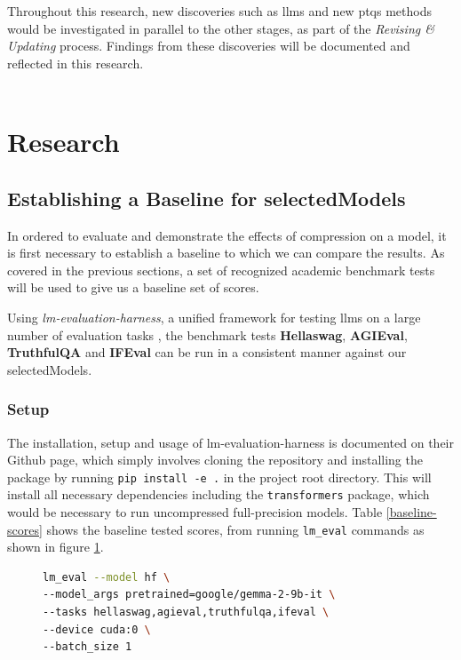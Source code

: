 \documentclass{ifacconf}
\begin{document}
	Throughout this research, new discoveries such as \glspl{llm} and new \glspl{ptq} methods would be investigated in parallel to the other stages, as part of the \textit{Revising \& Updating} process. Findings from these discoveries will be documented and reflected in this research.\\\\
	
	
	
	\section{Research}
	\subsection{Establishing a Baseline for \gls{selectedModels}}
    In ordered to evaluate and demonstrate the effects of compression on a model, it is first necessary to establish a baseline to which we can compare the results. As covered in the previous sections, a set of recognized academic benchmark tests will be used to give us a baseline set of scores.

    Using \textit{lm-evaluation-harness}, a unified framework for testing \glspl{llm} on a large number of evaluation tasks \cite{eval-harness}, the benchmark tests \textbf{Hellaswag}, \textbf{AGIEval}, \textbf{TruthfulQA} and \textbf{IFEval} can be run in a consistent manner against our \gls{selectedModels}.

    \subsubsection{Setup}
    The installation, setup and usage of lm-evaluation-harness is documented on their Github page, which simply involves cloning the repository and installing the package by running \verb|pip install -e .| in the project root directory. This will install all necessary dependencies including the \verb|transformers| package, which would be necessary to run uncompressed full-precision models. Table \ref{baseline-scores} shows the baseline tested scores, from running \verb|lm_eval| commands as shown in figure \ref{lm-eval-command}.

    \begin{figure}[H]
    \centering
    \begin{lstlisting}[language=bash,numbers=none]
lm_eval --model hf \
--model_args pretrained=google/gemma-2-9b-it \
--tasks hellaswag,agieval,truthfulqa,ifeval \
--device cuda:0 \
--batch_size 1
    \end{lstlisting}
    \label{lm-eval-command}
    \end{figure}
    
\end{document}
